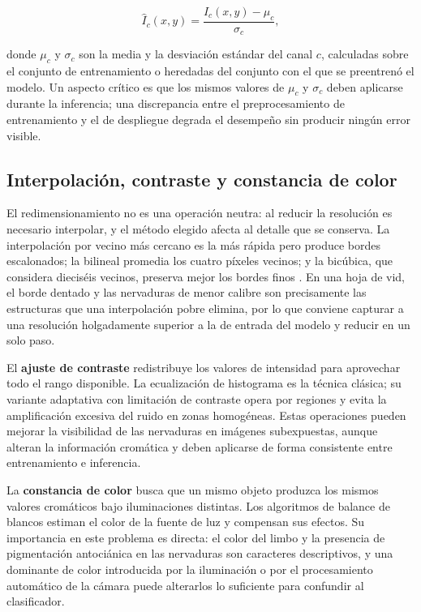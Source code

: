 \begin{equation}
\hat{I}_{c}(x,y) = \frac{I_{c}(x,y) - \mu_{c}}{\sigma_{c}},
\label{eq:normalizacion}
\end{equation}

\noindent donde $\mu_{c}$ y $\sigma_{c}$ son la media y la desviación
estándar del canal $c$, calculadas sobre el conjunto de entrenamiento o
heredadas del conjunto con el que se preentrenó el modelo. Un aspecto
crítico es que los mismos valores de $\mu_{c}$ y $\sigma_{c}$ deben
aplicarse durante la inferencia; una discrepancia entre el preprocesamiento
de entrenamiento y el de despliegue degrada el desempeño sin producir
ningún error visible.

\subsection{Interpolación, contraste y constancia de color}

El redimensionamiento no es una operación neutra: al reducir la resolución
es necesario interpolar, y el método elegido afecta al detalle que se
conserva. La interpolación por vecino más cercano es la más rápida pero
produce bordes escalonados; la bilineal promedia los cuatro píxeles
vecinos; y la bicúbica, que considera dieciséis vecinos, preserva mejor los
bordes finos \citep{gonzalez2018}. En una hoja de vid, el borde dentado y
las nervaduras de menor calibre son precisamente las estructuras que una
interpolación pobre elimina, por lo que conviene capturar a una resolución
holgadamente superior a la de entrada del modelo y reducir en un solo paso.

El \textbf{ajuste de contraste} redistribuye los valores de intensidad para
aprovechar todo el rango disponible. La ecualización de histograma es la
técnica clásica; su variante adaptativa con limitación de contraste opera
por regiones y evita la amplificación excesiva del ruido en zonas
homogéneas. Estas operaciones pueden mejorar la visibilidad de las
nervaduras en imágenes subexpuestas, aunque alteran la información
cromática y deben aplicarse de forma consistente entre entrenamiento e
inferencia.

La \textbf{constancia de color} busca que un mismo objeto produzca los
mismos valores cromáticos bajo iluminaciones distintas. Los algoritmos de
balance de blancos estiman el color de la fuente de luz y compensan sus
efectos. Su importancia en este problema es directa: el color del limbo y
la presencia de pigmentación antociánica en las nervaduras son caracteres
descriptivos, y una dominante de color introducida por la iluminación o por
el procesamiento automático de la cámara puede alterarlos lo suficiente
para confundir al clasificador.

